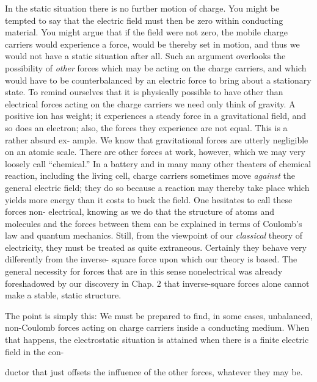In the static situation there is no further motion of charge. You
might be tempted to say that the electric field must then be zero
within conducting material. You might argue that if the field were
not zero, the mobile charge carriers would experience a force, would
be thereby set in motion, and thus we would not have a static situation
after all. Such an argument overlooks the possibility of \emph{other}
forces which may be acting on the charge carriers, and which would
have to be counterbalanced by an electric force to bring about a
stationary state. To remind ourselves that it is physically possible
to have other than electrical forces acting on the charge carriers we
need only think of gravity. A positive ion has weight; it experiences
a steady force in a gravitational field, and so does an electron; also,
the forces they experience are not equal. This is a rather absurd ex-
ample. We know that gravitational forces are utterly negligible on
an atomic scale. There are other forces at work, however, which we
may very loosely call ``chemical.'' In a battery and in many many
other theaters of chemical reaction, including the living cell, charge
carriers sometimes move \emph{against} the general electric field; they do so
because a reaction may thereby take place which yields more energy
than it costs to buck the field. One hesitates to call these forces non-
electrical, knowing as we do that the structure of atoms and molecules
and the forces between them can be explained in terms of
Coulomb's law and quantum mechanics. Still, from the viewpoint of
our \emph{classical} theory of electricity, they must be treated as quite 
extraneous. Certainly they behave very dilferently from the inverse-
square force upon which our theory is based. The general necessity
for forces that are in this sense nonelectrical was already foreshadowed
by our discovery in Chap. 2 that inverse-square forces alone
cannot make a stable, static structure.

The point is simply this: We must be prepared to find, in some
cases, unbalanced, non-Coulomb forces acting on charge carriers
inside a conducting medium. When that happens, the electrostatic
situation is attained when there is a finite electric field in the con-

ductor that just offsets the inffuence of the other forces, whatever
they may be.

